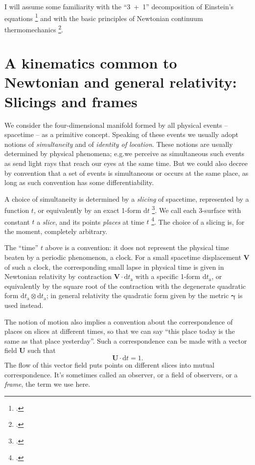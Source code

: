 \documentclass[\ifafour a4paper,12pt,\else a5paper,10pt,\fi%
onecolumn,oneside,article,%
british%
]{memoir}
\theoremstyle{remark}
\theoremstyle{innote}
\newcommand*{\citep}{\footcites}
\newcommand*{\di}{\mathrm{d}}%
\renewcommand*{\|}[1][]{\nonscript\,#1\vert\nonscript\;\mathopen{}}
\newcommand*{\sect}{\S}%
\newcommand*{\eg}{{e.g.}}
\newcommand*{\yrr}{M}
\newcommand*{\yr}{\bm{\yrr}}
\newcommand*{\ytn}{t_{\textrm{a}}}
\newcommand*{\ycc}{u}
\newcommand*{\yc}{\bm{\ycc}}
\newcommand*{\yffg}{\gamma}
\newcommand*{\yfg}{\bm{\yffg}}
\newcommand*{\yFF}{U}
\newcommand*{\yF}{\bm{\yFF}}
\newcommand*{\ynn}{V}
\newcommand*{\yn}{\bm{\ynn}}
\begin{document}
I will assume some familiarity with the \enquote{3~+~1} decomposition of
Einstein's equations \citep{smarretal1978,york1979,smarretal1980} and with
the basic principles of Newtonian continuum thermomechanics
\citep{truesdell1977_r1991,samohyletal1987_r2014,truesdelletal1960}.

\section{A kinematics common to Newtonian and general relativity:\\
  Slicings and frames}
\label{sec:slicing_frames}

We consider the four-dimensional manifold formed by all physical events --
spacetime -- as a primitive concept. Speaking of these events we usually
adopt notions of \emph{simultaneity} and of \emph{identity of location}.
These notions are usually determined by physical phenomena; \eg we perceive
as simultaneous such events as send light rays that reach our eyes at the
same time. But we could also decree by convention that a set of events is
simultaneous or occurs at the same place, as long as such convention has
some differentiability.

A choice of simultaneity is determined by a \emph{slicing} of spacetime,
represented by a function $t$, or equivalently by an exact 1-form $\di t$
\citep{york1979}. We call each 3-surface with constant $t$ a \emph{slice},
and its points \emph{places} at time $t$ \citep{smarretal1978,york1979,smarretal1980}[\sect~2.4]{marsdenetal1994}. The choice of a slicing is, for
the moment, completely arbitrary.

The \enquote{time} $t$ above is a convention: it does not represent the
physical time beaten by a periodic phenomenon, a clock. For a small
spacetime displacement $\yn$ of such a clock, the corresponding small lapse
in physical time is given in Newtonian relativity by contraction
$\yn\cdot\di\ytn$ with a specific 1-form $\di\ytn$, or equivalently by the
square root of the contraction with the degenerate quadratic form
$\di\ytn \otimes \di\ytn$; in general relativity the quadratic form given
by the metric $\yfg$ is used instead.

The notion of motion also implies a convention about the correspondence of
places on slices at different times, so that we can say \enquote{this place
  today is the same as that place yesterday}. Such a correspondence can be
made with a vector field $\yF$ such that
\begin{equation}
  \label{eq:observer_field_unit-time}
  \yF \cdot \di t = 1.
\end{equation}
The flow of this vector field puts points on different slices into mutual
correspondence. It's sometimes called an observer, or a field of observers,
or a \emph{frame}, the term we use here.
\end{document}
